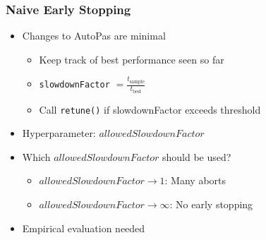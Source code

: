 \documentclass[
	10pt,
	t		%
]{beamer}
\begin{document}
\begin{frame}
    \frametitle{Naive Early Stopping}

    \begin{itemize}
        \item Changes to AutoPas are minimal
              \begin{itemize}
                  \item Keep track of best performance seen so far
                  \item \texttt{slowdownFactor} $= \frac{t_{\text{sample}}}{t_{\text{best}}}$
                  \item Call \texttt{retune()} if slowdownFactor exceeds threshold
              \end{itemize}


        \item Hyperparameter: $allowedSlowdownFactor$

        \item Which $allowedSlowdownFactor$ should be used?
              \begin{itemize}
                  \item $allowedSlowdownFactor \rightarrow 1$: Many aborts
                  \item $allowedSlowdownFactor \rightarrow \infty$: No early stopping
              \end{itemize}

        \item Empirical evaluation needed
    \end{itemize}
\end{frame}
\end{document}

